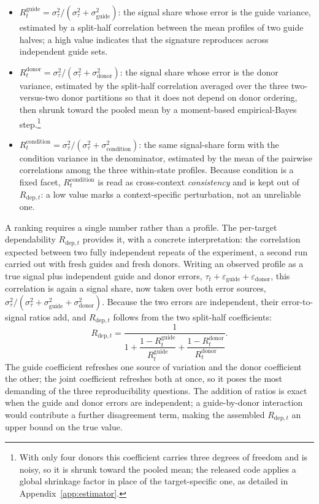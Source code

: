 \documentclass[11pt]{article}
\newcommand{\Rdep}{R_{\mathrm{dep},t}}
\newcommand{\Rg}{R^{\mathrm{guide}}_t}
\newcommand{\Rd}{R^{\mathrm{donor}}_t}
\newcommand{\Rc}{R^{\mathrm{condition}}_t}
\begin{document}
\begin{itemize}
  \item $\Rg = \sigma^2_\tau/(\sigma^2_\tau + \sigma^2_{\mathrm{guide}})$: the signal
  share whose error is the guide variance, estimated by a split-half correlation
  between the mean profiles of two guide halves; a high value indicates that the
  signature reproduces across independent guide sets.
  \item $\Rd = \sigma^2_\tau/(\sigma^2_\tau + \sigma^2_{\mathrm{donor}})$: the signal
  share whose error is the donor variance, estimated by the split-half correlation
  averaged over the three two-versus-two donor partitions so that it does not depend
  on donor ordering, then shrunk toward the pooled mean by a moment-based
  empirical-Bayes step.\footnote{With only four donors this coefficient carries three
  degrees of freedom and is noisy, so it is shrunk toward the pooled mean; the
  released code applies a global shrinkage factor in place of the target-specific one,
  as detailed in Appendix~\ref{app:estimator}.}
  \item $\Rc = \sigma^2_\tau/(\sigma^2_\tau + \sigma^2_{\mathrm{condition}})$: the same
  signal-share form with the condition variance in the denominator, estimated by the
  mean of the pairwise correlations among the three within-state profiles. Because
  condition is a fixed facet, $\Rc$ is read as cross-context \emph{consistency} and is
  kept out of $\Rdep$: a low value marks a context-specific perturbation, not an
  unreliable one.
\end{itemize}

A ranking requires a single number rather than a profile. The per-target
dependability $\Rdep$ provides it, with a concrete interpretation: the correlation
expected between two fully independent repeats of the experiment, a second run
carried out with fresh guides and fresh donors. Writing an observed profile as a
true signal plus independent guide and donor errors,
$\tau_t + \varepsilon_{\mathrm{guide}} + \varepsilon_{\mathrm{donor}}$, this
correlation is again a signal share, now taken over both error sources,
$\sigma^2_\tau / (\sigma^2_\tau + \sigma^2_{\mathrm{guide}}
+ \sigma^2_{\mathrm{donor}})$. Because the two errors are independent, their
error-to-signal ratios add, and $\Rdep$ follows from the two split-half
coefficients:
\begin{equation}
\Rdep = \frac{1}{1 + \dfrac{1 - \Rg}{\Rg} + \dfrac{1 - \Rd}{\Rd}}.
\label{eq:rdep}
\end{equation}
The guide coefficient refreshes one source of variation and the donor coefficient
the other; the joint coefficient refreshes both at once, so it poses the most
demanding of the three reproducibility questions. The addition of ratios is exact
when the guide and donor errors are independent; a guide-by-donor interaction would
contribute a further disagreement term, making the assembled $\Rdep$ an upper bound
on the true value.
\end{document}
